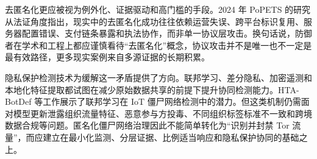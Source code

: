 去匿名化更应被视为例外化、证据驱动和高门槛的手段。2024 年 PoPETS 的研究从法证角度指出，现实中的去匿名化成功往往依赖运营失误、跨平台标识复用、服务器配置错误、支付链条暴露和执法协作，而非单一协议层攻击\cite{tippe2024onion}。换句话说，防御者在学术和工程上都应谨慎看待“去匿名化”概念，协议攻击并不是唯一也不一定是最有效路径，更多现实案例来自多源证据的长期积累。

隐私保护检测技术为缓解这一矛盾提供了方向。联邦学习、差分隐私、加密遥测和本地化特征提取都试图在减少原始数据共享的前提下提升协同检测能力。HTA-BotDef 等工作展示了联邦学习在 IoT 僵尸网络检测中的潜力\cite{hossain2025htabotdef}。但这类机制仍需面对模型更新泄露组织流量特征、恶意参与方投毒、不同组织标签标准不一致和跨境数据合规等问题。匿名化僵尸网络治理因此不能简单转化为“识别并封禁 Tor 流量”，而应建立在最小化监测、分层证据、比例适当响应和隐私保护协同的基础之上。